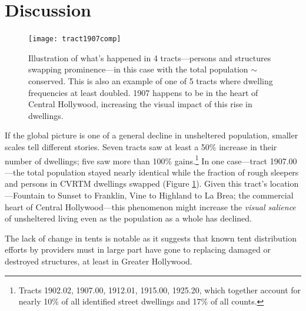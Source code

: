 \documentclass[11pt,twocolumn]{article}
\begin{document}
\section{Discussion}
\label{sec:discussion}

\begin{figure}[t]
	\centering
	\texttt{[image: tract1907comp]}
	\caption{Illustration of what's happened in 4 tracts---persons and structures
			swapping prominence---in this case with the total population
			$\sim$conserved. This is also an example of one of 5 tracts where
			dwelling frequencies at least doubled. 1907 happens to be in the 
			heart of Central Hollywood, increasing the visual impact of this
			rise in dwellings.}
	\label{fig:1907}
\end{figure}

If the global picture is one of a general decline in unsheltered population, smaller scales tell different 
stories. Seven tracts saw at least a 50\% increase in their number of dwellings; five saw more than 100\% 
gains.\footnote{Tracts 1902.02, 1907.00, 1912.01, 1915.00, 1925.20, which together account for nearly 
10\% of all identified street dwellings and 17\% of all counts.} 
In one case---tract 1907.00---the total population stayed nearly identical while the fraction of rough sleepers
and persons in CVRTM dwellings swapped (Figure \ref{fig:1907}). Given this tract's location---Fountain
to Sunset to Franklin, Vine to Highland to La Brea; the commercial heart of Central Hollywood---this
phenomenon might increase the {\it visual salience} of unsheltered living even as the population as a 
whole has declined. 

The lack of change in tents is notable as it suggests that known tent distribution efforts by 
providers must in large part have gone to replacing damaged or destroyed structures, at least 
in Greater Hollywood.

\end{document}
